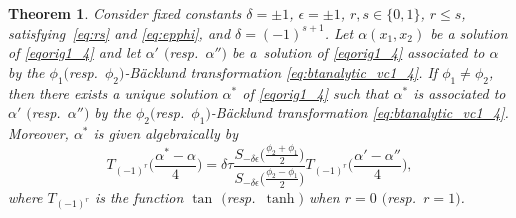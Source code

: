 \documentclass[10pt,a4paper]{amsart}
\numberwithin{equation}{section}
\newtheorem{Theorem}{Theorem}[section]
\begin{document}
\begin{Theorem}\label{th:superth1_4}
 Consider fixed constants $\delta=\pm 1$, $\epsilon=\pm 1$,
$r,s\in \{0,1\}$, $r\leq s$, satisfying~\eqref{eq:rs} and \eqref{eq:epphi}, and $\delta=(-1)^{s+1}$. Let $\alpha(x_1,x_2)$ be a solution of \eqref{eqorig1_4} and
 let $\alpha'$ $($resp.\ $\alpha'')$ be a~solution of \eqref{eqorig1_4}
 associated to $\alpha$ by the $\phi_1($resp.\ $\phi_2)$-B\"acklund transformation \eqref{eq:btanalytic_vc1_4}.
 If $\phi_1\neq \phi_2$, then there exists a unique solution $\alpha^*$ of
 \eqref{eqorig1_4} such that $\alpha^*$ is associated to $\alpha'$ $($resp.~$\alpha'')$ by the $\phi_2($resp.\ $\phi_1)$-B\"acklund transformation \eqref{eq:btanalytic_vc1_4}. Moreover, $\alpha^*$ is
given algebraically by
\begin{equation}\label{eq:superpos}
T_{(-1)^r}\biggl(\frac{\alpha^*-\alpha}{4}\biggr) =
\delta\tau \frac{S_{-\delta\epsilon}\bigl(\frac{\phi_2+\phi_1}{2}\bigr) } {S_{-\delta\epsilon}\bigl(\frac{\phi_2-\phi_1}{2}\bigr)}
T_{(-1)^r}\biggl(\frac{\alpha'-\alpha''}{4}\biggr),
\end{equation}
where $T_{(-1)^r}$ is the function $\tan$ $($resp.\ $\tanh)$ when $r=0$ $($resp.\ $r=1)$.
\end{Theorem}
\end{document}
